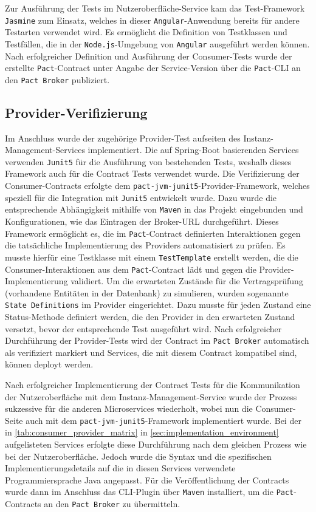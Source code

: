 Zur Ausführung der Tests im Nutzeroberfläche-Service kam das Test-Framework \texttt{Jasmine} zum Einsatz, welches in dieser \texttt{\gls{Angular}}-Anwendung bereits für andere Testarten verwendet wird.
Es ermöglicht die Definition von Testklassen und Testfällen, die in der \texttt{Node.js}-Umgebung von \texttt{\gls{Angular}} ausgeführt werden können.
Nach erfolgreicher Definition und Ausführung der Consumer-Tests wurde der erstellte \texttt{Pact}-Contract unter Angabe der Service-Version über die \texttt{Pact}-\gls{CLI} an den \texttt{Pact Broker} publiziert.

\subsection{Provider-Verifizierung}\label{subsec:implementation_execution_provider-verification}

Im Anschluss wurde der zugehörige Provider-Test aufseiten des Instanz-Management-Services implementiert.
Die auf \gls{Spring}-Boot basierenden Services verwenden \texttt{\gls{Junit5}} für die Ausführung von bestehenden Tests, weshalb dieses Framework auch für die Contract Tests verwendet wurde.
Die Verifizierung der Consumer-Contracts erfolgte dem \texttt{pact-jvm-junit5}-Provider-Framework, welches speziell für die Integration mit \texttt{\gls{Junit5}} entwickelt wurde.
Dazu wurde die entsprechende Abhängigkeit mithilfe von \texttt{\gls{Maven}} in das Projekt eingebunden und Konfigurationen, wie \zB das Eintragen der Broker-\gls{URL} durchgeführt.
Dieses Framework ermöglicht es, die im \texttt{Pact}-Contract definierten Interaktionen gegen die tatsächliche Implementierung des Providers automatisiert zu prüfen.
Es musste hierfür eine Testklasse mit einem \texttt{TestTemplate} erstellt werden, die die Consumer-Interaktionen aus dem \texttt{Pact}-Contract lädt und gegen die Provider-Implementierung validiert.
Um die erwarteten Zustände für die Vertragsprüfung (\zB vorhandene Entitäten in der Datenbank) zu simulieren, wurden sogenannte \texttt{State Definitions} im Provider eingerichtet.
Dazu musste für jeden Zustand eine Status-Methode definiert werden, die den Provider in den erwarteten Zustand versetzt, bevor der entsprechende Test ausgeführt wird.
Nach erfolgreicher Durchführung der Provider-Tests wird der Contract im \texttt{Pact Broker} automatisch als verifiziert markiert und Services, die mit diesem Contract kompatibel sind, können deployt werden.

Nach erfolgreicher Implementierung der Contract Tests für die Kommunikation der Nutzer\-ober\-fläche mit dem Instanz-Management-Service wurde der Prozess sukzessive für die anderen Microservices wiederholt, wobei nun die Consumer-Seite auch mit dem \texttt{pact-jvm-junit5}-Framework implementiert wurde.
Bei der in \cref{tab:consumer_provider_matrix} in \cref{sec:implementation_environment} aufgelisteten Services erfolgte diese Durchführung nach dem gleichen Prozess wie bei der Nutzeroberfläche.
Jedoch wurde die Syntax und die spezifischen Implementierungsdetails auf die in diesen Services verwendete Programmiersprache Java angepasst.
Für die Veröffentlichung der Contracts wurde dann im Anschluss das \gls{CLI}-Plugin über \texttt{Maven} installiert, um die \texttt{Pact}-Contracts an den \texttt{Pact Broker} zu übermitteln.

